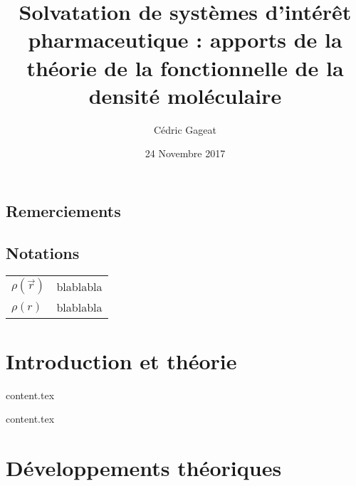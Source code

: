 \documentclass{bredele}
\title{Solvatation de systèmes d’intérêt pharmaceutique : apports de la théorie de la fonctionnelle de la densité moléculaire}
\author{Cédric Gageat}
\institute{l'\'Ecole Normale Supérieure}
\date{24 Novembre 2017}
\begin{document}
\tikzexternaldisable
\maketitle{}
\tikzexternalenable


\cleardoublepage
	
\frontmatter
\chapter*{Remerciements}


\clearemptydoublepage



\renewcommand\contentsname{Sommaire}
\tableofcontents
 
 
\renewcommand{\cftdotsep}{\cftnodots}
\cleardoublepage
\listoffigures
\cleardoublepage
\listoftables


\clearemptydoublepage
\chapter*{Notations}
\thispagestyle{empty}
\begin{tabular}{ll}
$\rho(\vec{r})$ & blablabla \\
$\rho(r)$ & blablabla 
\end{tabular}




\clearemptydoublepage
\mainmatter

\part{Introduction et théorie}

\clearemptydoublepage
{content.tex}

\clearemptydoublepage
{content.tex}

\part{Développements théoriques}
\end{document}
